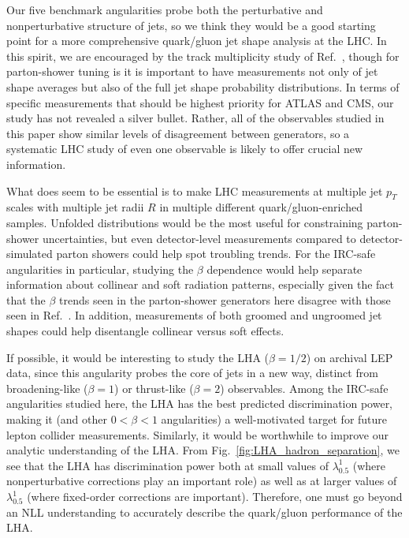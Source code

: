 \documentclass[11pt,letterpaper]{article}
\DeclareRobustCommand{\Fig}[1]{Fig.~\ref{#1}}
\DeclareRobustCommand{\Ref}[1]{Ref.~\cite{#1}}
\begin{document}
Our five benchmark angularities probe both the perturbative and nonperturbative structure of jets, so we think they would be a good starting point for a more comprehensive quark/gluon jet shape analysis at the LHC.  In this spirit, we are encouraged by the track multiplicity study of \Ref{Aad:2016oit}, though for parton-shower tuning is it is important to have measurements not only of jet shape averages but also of the full jet shape probability distributions.  In terms of specific measurements that should be highest priority for ATLAS and CMS, our study has not revealed a silver bullet.  Rather, all of the observables studied in this paper show similar levels of disagreement between generators, so a systematic LHC study of even one observable is likely to offer crucial new information.

What does seem to be essential is to make LHC measurements at multiple
jet $p_T$ scales with multiple jet radii $R$ in multiple different
quark/gluon-enriched samples.  Unfolded distributions would be the
most useful for constraining parton-shower uncertainties, but even
detector-level measurements compared to detector-simulated parton
showers could help spot troubling trends.  For the IRC-safe
angularities in particular, studying the $\beta$ dependence would help
separate information about collinear and soft radiation patterns,
especially given the fact that the $\beta$ trends seen in the
parton-shower generators here disagree with those seen in
\Ref{Aad:2014gea}.  In addition, measurements of both groomed and
ungroomed jet shapes could help disentangle collinear versus soft
effects.

If possible, it would be interesting to study the LHA ($\beta = 1/2$) on archival LEP data, since this angularity probes the core of jets in a new way, distinct from broadening-like ($\beta = 1$) or thrust-like ($\beta = 2$) observables.  Among the IRC-safe angularities studied here, the LHA has the best predicted discrimination power, making it (and other $0<\beta < 1$ angularities) a well-motivated target for future lepton collider measurements.  Similarly, it would be worthwhile to improve our analytic understanding of the LHA.  From \Fig{fig:LHA_hadron_separation}, we see that the LHA has discrimination power both at small values of $\lambda_{0.5}^1$ (where nonperturbative corrections play an important role) as well as at larger values of $\lambda_{0.5}^1$ (where fixed-order corrections are important).  Therefore, one must go beyond an NLL understanding to accurately describe the quark/gluon performance of the LHA.
\end{document}
